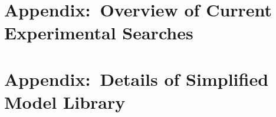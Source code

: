 \documentclass[a4paper,debug,notitlepage,nobib]{tufte-book}
\begin{document}
\chapter{Appendix:~Overview of Current Experimental Searches}
\label{sec:experimental_searches}


\chapter{Appendix:~Details of Simplified Model Library}
\label{sec:library_more}


%

%

%
% 
%
%
%
%
%
\printbibliography
\end{document}
